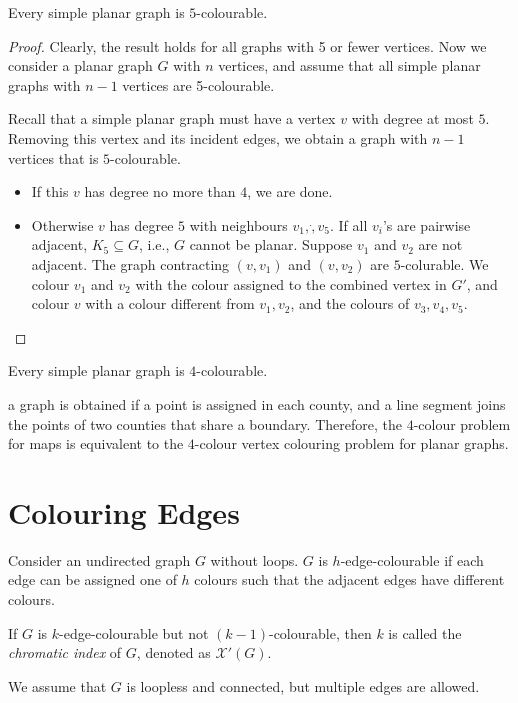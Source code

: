 \begin{theorem}
Every simple planar graph is $5$-colourable.
\end{theorem}
\begin{proof}
Clearly, the result holds for all graphs with 5 or fewer vertices. Now we consider a planar graph $G$ with $n$ vertices, and assume that all simple planar graphs with $n - 1$ vertices are 5-colourable.

Recall that a simple planar graph must have a vertex $v$ with degree at most $5$.
Removing this vertex and its incident edges, we obtain a graph with $n-1$ vertices that is $5$-colourable.
\begin{itemize}
\item
If this $v$ has degree no more than $4$, we are done.
\item
Otherwise $v$ has degree $5$ with neighbours $v_1,\dot,v_5$. If all $v_i$'s are pairwise adjacent, $K_5\subseteq G$, i.e., $G$ cannot be planar. Suppose $v_1$ and $v_2$ are not adjacent. The graph contracting $(v,v_1)$ and $(v,v_2)$ are $5$-colurable. We colour $v_1$ and $v_2$ with the colour assigned to the combined vertex in $G'$, and colour $v$ with a colour different from $v_1,v_2$, and the colours of $v_3,v_4,v_5$.
\end{itemize}
\end{proof}

\begin{theorem}
Every simple planar graph is $4$-colourable.
\end{theorem}

\begin{remark}
a graph is obtained if a point is assigned in each county, and a line segment joins the points of two counties that share a boundary.
Therefore, the $4$-colour problem for maps is equivalent to the $4$-colour vertex colouring problem for planar graphs.
\end{remark}


\section{Colouring Edges}
\begin{definition}
Consider an undirected graph $G$ without loops.
$G$ is $h$-edge-colourable if each edge can be assigned one of $h$ colours such that the adjacent edges have different colours.

If $G$ is $k$-edge-colourable but not $(k-1)$-colourable, then $k$ is called the \emph{chromatic index} of $G$, denoted as $\mathcal{X}'(G)$.
 \end{definition}
We assume that $G$ is loopless and connected, but multiple edges are allowed.

